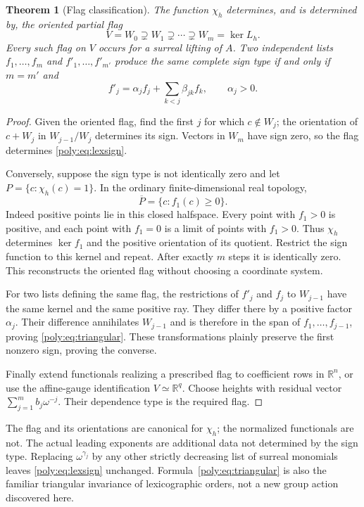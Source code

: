 \documentclass[11pt,a4paper]{article}
\numberwithin{equation}{section}
\newtheorem{theorem}{Theorem}[section]
\theoremstyle{plain}
\newcommand{\R}{\mathbb R}
\begin{document}
\begin{theorem}[Flag classification]\label{poly:thm:flag}
The function $\chi_h$ determines, and is determined by, the oriented partial
flag
\[
 V=W_0\supsetneq W_1\supsetneq\cdots\supsetneq W_m=\ker L_h.
\]
Every such flag on $V$ occurs for a surreal lifting of $A$.
Two independent lists $f_1,\ldots,f_m$ and $f'_1,\ldots,f'_{m'}$
produce the same complete sign type if and only if $m=m'$ and
\begin{equation}\label{poly:eq:triangular}
 f'_j=\alpha_j f_j+\sum_{k<j}\beta_{jk}f_k,
 \qquad \alpha_j>0.
\end{equation}
\end{theorem}
\begin{proof}
Given the oriented flag, find the first $j$ for which $c\notin W_j$;
the orientation of $c+W_j$ in $W_{j-1}/W_j$ determines its sign. Vectors
in $W_m$ have sign zero, so the flag determines \eqref{poly:eq:lexsign}.

Conversely, suppose the sign type is not identically zero and let
$P=\{c:\chi_h(c)=1\}$. In the ordinary finite-dimensional real topology,
\[
 \overline P=\{c:f_1(c)\ge0\}.
\]
Indeed positive points lie in this closed halfspace. Every point with
$f_1>0$ is positive, and each point with $f_1=0$ is a limit of points with
$f_1>0$. Thus $\chi_h$ determines $\ker f_1$ and the positive orientation
of its quotient. Restrict the sign function to this kernel and repeat.
After exactly $m$ steps it is identically zero. This reconstructs the
oriented flag without choosing a coordinate system.

For two lists defining the same flag, the restrictions of $f'_j$ and $f_j$
to $W_{j-1}$ have the same kernel and the same positive ray. They differ
there by a positive factor $\alpha_j$. Their difference annihilates
$W_{j-1}$ and is therefore in the span of $f_1,\ldots,f_{j-1}$, proving
\eqref{poly:eq:triangular}. These transformations plainly preserve the first
nonzero sign, proving the converse.

Finally extend functionals realizing a prescribed flag to coefficient rows
in $\R^n$, or use the affine-gauge identification $V\simeq\R^q$.
Choose heights with residual vector $\sum_{j=1}^m b_j\omega^{-j}$.
Their dependence type is the required flag.
\end{proof}

\begin{remark}
The flag and its orientations are canonical for $\chi_h$; the normalized
functionals are not. The actual leading exponents are additional data not
determined by the sign type. Replacing $\omega^{\gamma_j}$ by any other
strictly decreasing list of surreal monomials leaves \eqref{poly:eq:lexsign}
unchanged. Formula~\eqref{poly:eq:triangular} is also the familiar triangular
invariance of lexicographic orders, not a new group action discovered here.
\end{remark}
\end{document}
